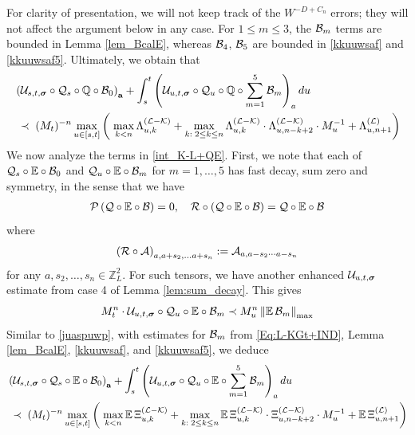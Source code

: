 For clarity of presentation, we will not keep track of the $W^{-D+C_{n}}$ errors; they will not affect the argument below in any case. For $1\le m\le 3$, the ${\cal B}_{m}$ terms are bounded in Lemma  \ref{lem_BcalE}, whereas ${\cal B}_4$, ${\cal B}_5$ are bounded in \eqref{kkuuwsaf} and \eqref{kkuuwsaf5}. Ultimately, we obtain that
\begin{align}\label{juaspuwp}
   & \left(\mathcal{U}_{s, t, \boldsymbol{\sigma}} \circ  {\cal Q}_s\circ \mathbb Q\circ  {\cal B}_0\right)_{\textbf{a}} +  \int_{s}^t \left(\mathcal{U}_{u, t, \boldsymbol{\sigma}} \circ  {\cal Q}_u\circ \mathbb Q\circ  \sum_{m=1}^5{\cal B}_m  \right)_a du
    \\\nonumber
    &\; \prec \;(M_t)^{-n}\max_{u\in[s,t]}\left(\; \max_{k<n }\Lambda^{({\cal L-\cal K})}_{u,k}+\max_{k:\;2\le k\le n }\Lambda^{({\cal L-\cal K})}_{u,k}\cdot \Lambda^{({\cal L-\cal K})}_{u,n-k+2}\cdot M_u^{-1}+\Lambda^{({\cal L})}_{u,n+1}\right)
\end{align}
We now analyze the terms in \eqref{int_K-L+QE}. First, we note that each of ${\cal Q}_s\circ \mathbb E\circ   {\cal B}_0$ and ${\cal Q}_u\circ \mathbb E\circ   {\cal B}_m$ for $m=1,\ldots,5$ has fast decay, sum zero and symmetry, in the sense that we have
 \begin{align}
{\cal P} \left( {\cal Q} \circ \mathbb E\circ   {\cal B} \right)=0,\quad {\cal R}\circ  \left( {\cal Q} \circ \mathbb E\circ   {\cal B} \right)= {\cal Q} \circ \mathbb E\circ   {\cal B} \label{eq:case4_B}
 \end{align}
where $$\left( {\cal R}\circ {\cal A}\right)_{a,a+s_2,\ldots a+s_n} : = {\cal A}_{a,a-s_{2}\cdots a-s_{n}}$$ for any $a, s_2,\ldots, s_n\in \mathbb{Z}_L^2$. For such tensors, we have another enhanced ${\cal U}_{u,t,\boldsymbol{\sigma}}$ estimate from case 4 of Lemma \ref{lem:sum_decay}. This gives
 $$ M_{t}^{n}\cdot \mathcal{U}_{u, t, \boldsymbol{\sigma}} \circ  {\cal Q}_u\circ \mathbb E\circ   {\cal B}_m  \prec M_{u}^n \left\|\mathbb E \,{\cal B}_m\right\|_{\max} 
$$
Similar to \eqref{juaspuwp}, with estimates for ${\cal B}_{m}$ from \eqref{Eq:L-KGt+IND}, Lemma  \ref{lem_BcalE}, \eqref{kkuuwsaf}, and \eqref{kkuuwsaf5},  we deduce
\begin{align} \label{juaspuwp234}
   & \left(\mathcal{U}_{s, t, \boldsymbol{\sigma}} \circ  {\cal Q}_s\circ \mathbb E\circ  {\cal B}_0\right)_{\textbf{a}} +  \int_{s}^t \left(\mathcal{U}_{u, t, \boldsymbol{\sigma}} \circ  {\cal Q}_u\circ \mathbb E\circ  \sum_{m=1}^5{\cal B}_m  \right)_a du
    \\\nonumber
    &\; \prec \;(M_t)^{-n}\max_{u\in[s,t]}\left(\; \max_{k<n }\mathbb E \,\Xi^{({\cal L-\cal K})}_{u,k}+\max_{k:\;2\le k\le n }\mathbb E \, \Xi^{({\cal L-\cal K})}_{u,k}\cdot \Xi^{({\cal L-\cal K})}_{u,n-k+2}\cdot M_u^{-1}+\mathbb E \,\Xi^{({\cal L})}_{u,n+1}\right)
\end{align}
